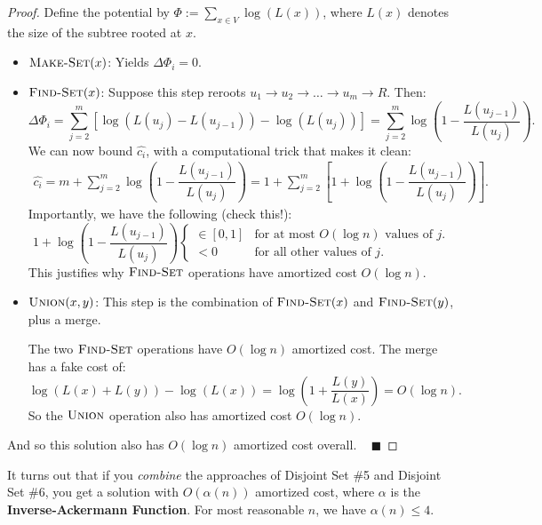 \begin{proof}
    Define the potential by $\Phi := \sum_{x \in V} \log (L(x))$, where $L(x)$ denotes the size of the subtree rooted at $x$.
    \begin{itemize}
        \item $\textsc{Make-Set}(x)$: Yields $\Delta \Phi_i = 0$.
        \item $\textsc{Find-Set}(x)$: Suppose this step reroots $u_1 \to u_2 \to \dots \to u_m \to R$.  Then:
        \[ \Delta \Phi_i = \sum_{j = 2}^{m} \left [ \log (L(u_j) - L(u_{j - 1})) - \log (L(u_j)) \right ] = \sum_{j = 2}^m \log \left ( 1 - \dfrac{L(u_{j - 1})}{L(u_j)}\right). \]
        We can now bound $\hat{c_i}$, with a computational trick that makes it clean:
        \begin{align*}
            \hat{c_i} = m + \sum_{j = 2}^m \log \left(1 - \dfrac{L(u_{j - 1})}{L(u_j)} \right) = 1 + \sum_{j = 2}^m \left [ 1 + \log \left(1 - \dfrac{L(u_{j - 1})}{L(u_j)}\right) \right ].
        \end{align*}
        Importantly, we have the following (check this!):
        \[ 1 + \log \left(1 - \dfrac{L(u_{j - 1})}{L(u_j)}\right) \begin{cases} \in [0, 1] & \text{for at most } O(\log n) \text{ values of } j. \\ <0 & \text{for all other values of } j. \end{cases} \]
        This justifies why $\textsc{Find-Set}$ operations have amortized cost $O(\log n)$.
        \item $\textsc{Union}(x, y)$: This step is the combination of $\textsc{Find-Set}(x)$ and $\textsc{Find-Set}(y)$, plus a merge.

        The two $\textsc{Find-Set}$ operations have $O(\log n)$ amortized cost.  The merge has a fake cost of:
        \[ \log (L(x) + L(y)) - \log (L(x)) = \log \left ( 1 + \dfrac{L(y)}{L(x)} \right) = O( \log n). \]
        So the $\textsc{Union}$ operation also has amortized cost $O(\log n)$.
    \end{itemize}
    And so this solution also has $O(\log n)$ amortized cost overall. ~ $\blacksquare$
\end{proof}

It turns out that if you \emph{combine} the approaches of Disjoint Set \#5 and Disjoint Set \#6, you get a solution with $O(\alpha(n))$ amortized cost, where $\alpha$ is the \textbf{Inverse-Ackermann Function}.  For most reasonable $n$, we have $\alpha(n) \leq 4$.

